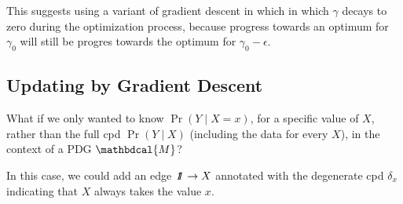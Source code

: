 \documentclass{article}
\theoremstyle{plain}
\newtheorem{claim}[theorem]{Claim}%
\theoremstyle{definition}
\theoremstyle{remark}
\newcommand\commentout[1]{}
\let\H\relax
\DeclareMathOperator{\H}{\mathrm{H}} %
\newcommand\mat[1]{\mathbf{#1}}
\newcommand{\thickD}{I\mkern-8muD}
\newcommand{\kldiv}{\thickD\infdivx}
\newcommand{\bp}[1][L]{\mat{p}_{\!_{#1}\!}}
\newcommand{\V}{\mathcal V}
\newcommand{\dg}[1]{\mathbdcal{#1}}
\newcommand\smid{\!\mid\!}
\newcommand{\pdgunit}{\mathrlap{\mathit 1} \mspace{2.3mu}\mathit 1}
\newcommand{\ed}[3]{%
	\mathchoice%
	{#2\overset{\smash{\mskip-5mu\raisebox{-3pt}{${#1}$}}}{\xrightarrow{\hphantom{\scriptstyle {#1}}}} #3} %
	{#2\overset{\smash{\mskip-5mu\raisebox{-3pt}{$\scriptstyle {#1}$}}}{\xrightarrow{\hphantom{\scriptstyle {#1}}}} #3}%
	{#2\overset{\smash{\mskip-5mu\raisebox{-3pt}{$\scriptscriptstyle {#1}$}}}{\xrightarrow{\hphantom{\scriptscriptstyle {#1}}}} #3} %
	{#2\overset{\smash{\mskip-5mu\raisebox{-3pt}{$\scriptscriptstyle {#1}$}}}{\xrightarrow{\hphantom{\scriptscriptstyle {#1}}}} #3}} %
\newcommand{\alle}[1][L]{_{\ed {#1}XY}}
\begin{document}
This suggests using a variant of gradient descent in which
in which $\gamma$ decays to zero during the optimization process, because
progress towards an optimum for $\gamma_0$ will still be progres towards  
the optimum for $\gamma_0 - \epsilon$.  




\commentout{%
	\begin{defn}[degree of inconsistency]
		If $\dg M$ is a PDG, let $\aar{\dg M}_\gamma$ denote the \emph{degree of
		inconsistency} of $\dg M$ at $\gamma$, and be given by
		$$ \aar{\dg M}_\gamma := \inf_{\mu \in \Delta[\V(\dg M)]} 
			\sum\alle \beta_L \;\kldiv{\mu_{Y|X}}{\bp} + \alpha_L\;\H_\mu(Y\mid X)
		$$
		and let $\aar[\Big]{\dg M} = \lim_{\gamma\to 0^+} \aar{\dg M}_\gamma$.
	\end{defn}

	\begin{claim}
		$$\bbr{\dg M}_\gamma(\mu) = $$
	\end{claim}
}%



\subsection{Updating by Gradient Descent}

\commentout{
	If, rather than fixing $\dg M$ and optimizing $p$, we fix $p$ and optimize $\dg M$,
	this same proces corresponds to an update, rather than an inference. For instance, in
	the case where $X = \pdgunit$, an observation $Y\!=\!y$  can be added to
	$\dg M$ in the form of an edge $\ed{\delta_y}{\pdgunit}Y$, getting the
	(possibly inconsistent) PDG $\dg M'$. The distribution $\bbr{M'}^*$ turns out
	to be the result of conditioning $\bbr{\dg M}^*$ on $Y\!=\!y$.  
}

What if we only wanted to know $\Pr(Y \smid X=x)$, for a specific value of $X$, rather than
the full cpd $\Pr(Y\smid X)$ (including the data for every $X$), in the context of a PDG $\dg M$?

In this case, we could add an edge $\pdgunit \to X$ annotated with the degenerate cpd $\delta_x$ 
indicating that $X$ always takes the value $x$. 
\end{document}
